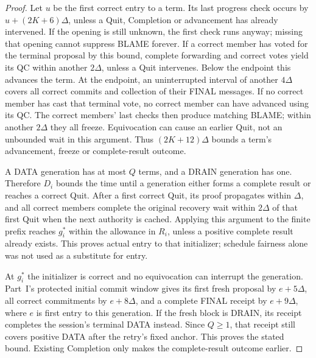 \begin{proof}
Let $u$ be the first correct entry to a term. Its last progress check
occurs by $u+(2K+6)\Delta$, unless a Quit, Completion or advancement
has already intervened. If the opening is still unknown, the first
check runs anyway; missing that opening cannot suppress BLAME forever.
If a correct member has voted for the terminal proposal by this bound,
complete forwarding and correct votes yield its QC within another
$2\Delta$, unless a Quit intervenes. Below the endpoint this advances
the term. At the endpoint, an uninterrupted interval of another
$4\Delta$ covers all correct commits and collection of their FINAL
messages. If no correct member has cast that terminal vote, no correct
member can have advanced using its QC. The correct members' last
checks then produce matching BLAME; within another $2\Delta$ they all
freeze. Equivocation can cause an earlier Quit, not an unbounded wait
in this argument. Thus $(2K+12)\Delta$ bounds a term's advancement,
freeze or complete-result outcome.

A DATA generation has at most $Q$ terms, and a DRAIN generation has
one. Therefore $D_i$ bounds the time until a generation either forms a
complete result or reaches a correct Quit. After a first correct Quit,
its proof propagates within $\Delta$, and all correct members complete
the original recovery wait within $2\Delta$ of that first Quit when
the next authority is cached. Applying this argument to the finite
prefix reaches $g_i^*$ within the allowance in $R_i$, unless a positive
complete result already exists. This proves actual entry to that
initializer; schedule fairness alone was not used as a substitute for
entry.

At $g_i^*$ the initializer is correct and no equivocation can interrupt
the generation. Part~I's protected initial commit window gives its
first fresh proposal by $e+5\Delta$, all correct commitments by
$e+8\Delta$, and a complete FINAL receipt by $e+9\Delta$, where $e$
is first entry to this generation. If the fresh block is DRAIN, its
receipt completes the session's terminal DATA instead. Since $Q\ge1$,
that receipt still covers positive DATA after the retry's fixed anchor.
This proves the stated bound. Existing Completion only makes the
complete-result outcome earlier.
\end{proof}


